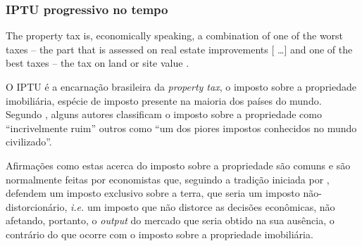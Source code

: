 \documentclass[
	12pt,				%
	oneside,			%
	a4paper,			%
	chapter=TITLE,		%
	section=TITLE,		%
	english,			%
	brazil				%
	]{abntex2}
\begin{document}
\begin{refsection}
\hypertarget{iptu-progressivo-no-tempo}{%
\subsubsection{IPTU progressivo no tempo}\label{iptu-progressivo-no-tempo}}
\begin{citacao}
The property tax is, economically speaking, a combination of one of the worst
taxes -- the part that is assessed on real estate improvements [ \ldots] and one
of the best taxes -- the tax on land or site value .
\end{citacao}
O \gls{IPTU} é a encarnação brasileira da \emph{property tax}, o imposto sobre a
propriedade imobiliária, espécie de imposto presente na maioria dos países do
mundo. Segundo \textcite[p.~101]{spinney}, alguns autores classificam o imposto sobre a
propriedade como ``incrivelmente ruim'' outros como ``um dos piores impostos
conhecidos no mundo civilizado''.

Afirmações como estas acerca do imposto sobre a propriedade são comuns e são
normalmente feitas por economistas que, seguindo a tradição iniciada por
\textcite{henrygeorge}, defendem um imposto exclusivo sobre a terra, que seria um imposto
não-distorcionário, \emph{i.e.} um imposto que não distorce as decisões econômicas,
não afetando, portanto, o \emph{output} do mercado que seria obtido na sua ausência,
o contrário do que ocorre com o imposto sobre a propriedade imobiliária.


\end{refsection}
\end{document}
